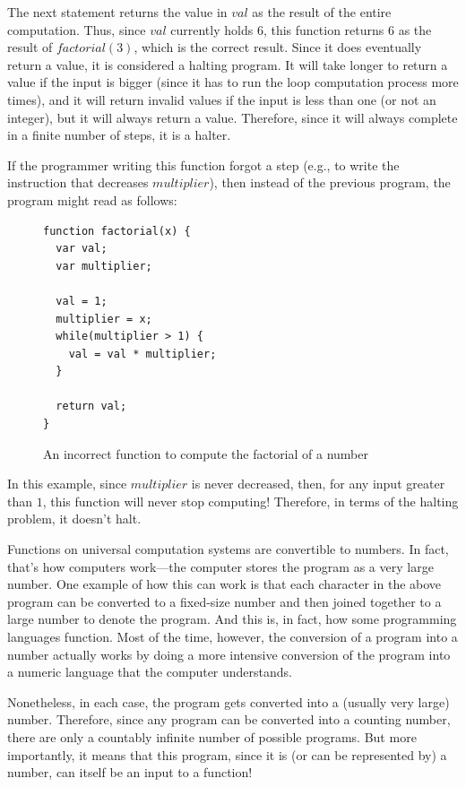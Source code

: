 The next statement returns the value in $val$ as the result of the entire computation.  Thus, since $val$ currently holds $6$, this function returns $6$ as the result of $factorial(3)$, which is the correct result.  Since it does eventually return a value, it is considered a halting program.  It will take longer to return a value if the input is bigger (since it has to run the loop computation process more times), and it will return invalid values if the input is less than one (or not an integer), but it will always return a value.  Therefore, since it will always complete in a finite number of steps, it is a halter.

If the programmer writing this function forgot a step (e.g., to write the instruction that decreases $multiplier$), then instead of the previous program, the program might read as follows:

\begin{figure}[H]
\begin{mdframed}
\begin{verbatim}
function factorial(x) {
  var val;
  var multiplier;

  val = 1;
  multiplier = x;
  while(multiplier > 1) {
    val = val * multiplier;
  }

  return val;
}
\end{verbatim}
\end{mdframed}
\caption{An incorrect function to compute the factorial of a number}
\end{figure}

In this example, since $multiplier$ is never decreased, then, for any input greater than $1$, this function will never stop computing!  Therefore, in terms of the halting problem, it doesn't halt.

Functions on universal computation systems are convertible to numbers.  In fact, that's how computers work---the computer stores the program as a very large number.  One example of how this can work is that each character in the above program can be converted to a fixed-size number and then joined together to a large number to denote the program.  And this is, in fact, how some programming languages function.  Most of the time, however, the conversion of a program into a number actually works by doing a more intensive conversion of the program into a numeric language that the computer understands.  

Nonetheless, in each case, the program gets converted into a (usually very large) number.  Therefore, since any program can be converted into a counting number, there are only a countably infinite number of possible programs.  But more importantly, it means that this program, since it is (or can be represented by) a number, can itself be an input to a function!

